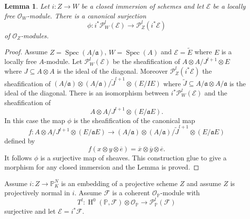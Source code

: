 \documentclass{amsart}
\theoremstyle{plain}
\newtheorem{lemma}[theorem]{Lemma}
\theoremstyle{definition}
\theoremstyle{remark}
\numberwithin{equation}{theorem}
\begin{document}
\begin{lemma} \label{surjective} Let $i:Z\rightarrow W$ be a closed immersion of
  schemes and let ${\mathcal{E}}$ be a locally free ${\mathcal{O} }_W$-module. There is a
  canonical surjection
\[ \phi:i^*{\mathcal{P} }^l_W({\mathcal{E}})\rightarrow {\mathcal{P} }^l_Z(i^*{\mathcal{E}}) \]
of ${\mathcal{O} }_Z$-modules.
\end{lemma}
\begin{proof} Assume $Z={\operatorname{Spec} }(A/{\mathfrak{a}})$, $W={\operatorname{Spec} }(A)$ and ${\mathcal{E}}=\tilde{E}$
  where $E$ is a locally free $A$-module.
Let ${\mathcal{P} }^l_W({\mathcal{E}})$ be the sheafification of $A\otimes A/J^{l+1}\otimes
E$ where $J\subseteq A\otimes A$ is the ideal of the diagonal.
Moreover ${\mathcal{P} }^l_Z(i^*{\mathcal{E}})$ the sheafification of $(A/{\mathfrak{a}})\otimes
(A/{\mathfrak{a}})/\tilde{J}^{l+1}\otimes (E/IE)$
where $\tilde{J}\subseteq A/{\mathfrak{a}} \otimes A/{\mathfrak{a}}$ is the ideal of the diagonal.
There is an isomorphism between $i^*{\mathcal{P} }^l_W({\mathcal{E}})$ and the
sheafification of
\[A\otimes A/J^{l+1}\otimes (E/{\mathfrak{a}} E) .\]
In this case the map $\phi$ is the sheafification of the canonical map
\[ f:A\otimes A/J^{l+1}\otimes (E/{\mathfrak{a}} E) \rightarrow (A/{\mathfrak{a}} )\otimes
(A/{\mathfrak{a}} )/\tilde{J}^{l+1}\otimes (E/{\mathfrak{a}} E) \]
defined by
\[ f(x\otimes y \otimes \overline{e})=\overline{x}\otimes
\overline{y}\otimes \overline{e} .\]
It follows $\phi$ is a surjective map of sheaves. This construction
glue to give a morphism for any closed immersion and the Lemma is
proved.
\end{proof}

Assume $i:Z\rightarrow {\mathbb{P}}^N_K$ is an embedding of a projective scheme $Z$
and assume $Z$ is projectively normal in $i$. Assume ${\mathcal{F}}$ is a coherent ${\mathcal{O} }_{\mathbb{P}}$-module with 
\[ T^l:{\operatorname{H} }^0({\mathbb{P}},{\mathcal{F}})\otimes {\mathcal{O} }_{\mathbb{P}} \rightarrow {\mathcal{P} }^l_{\mathbb{P}}({\mathcal{F}}) \]
surjective and let ${\mathcal{E}}=i^*{\mathcal{F}}$.
\end{document}
